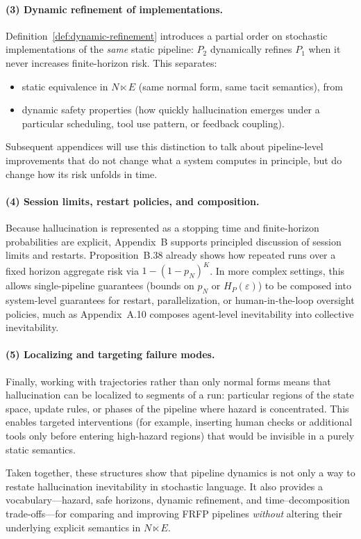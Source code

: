 \paragraph{(3) Dynamic refinement of implementations.}
Definition~\ref{def:dynamic-refinement} introduces a partial order on
stochastic implementations of the \emph{same} static pipeline: $P_2$
dynamically refines $P_1$ when it never increases finite-horizon risk.
This separates:
\begin{itemize}
  \item static equivalence in $N \ltimes E$ (same normal form, same tacit
        semantics), from
  \item dynamic safety properties (how quickly hallucination emerges under a
        particular scheduling, tool use pattern, or feedback coupling).
\end{itemize}
Subsequent appendices will use this distinction to talk about pipeline-level
improvements that do not change what a system computes in principle, but do
change how its risk unfolds in time.

\paragraph{(4) Session limits, restart policies, and composition.}
Because hallucination is represented as a stopping time and finite-horizon
probabilities are explicit, Appendix~B supports principled discussion of
session limits and restarts. Proposition~B.38 already shows how repeated
runs over a fixed horizon aggregate risk via $1 - (1 - p_N)^K$. In more
complex settings, this allows single-pipeline guarantees (bounds on $p_N$
or $H_P(\varepsilon)$) to be composed into system-level guarantees for
restart, parallelization, or human-in-the-loop oversight policies, much as
Appendix~A.10 composes agent-level inevitability into collective inevitability.

\paragraph{(5) Localizing and targeting failure modes.}
Finally, working with trajectories rather than only normal forms means that
hallucination can be localized to segments of a run: particular regions of
the state space, update rules, or phases of the pipeline where hazard is
concentrated. This enables targeted interventions (for example, inserting
human checks or additional tools only before entering high-hazard regions)
that would be invisible in a purely static semantics.

Taken together, these structures show that pipeline dynamics is not only a
way to restate hallucination inevitability in stochastic language. It also
provides a vocabulary---hazard, safe horizons, dynamic refinement, and
time--decomposition trade-offs---for comparing and improving FRFP pipelines
\emph{without} altering their underlying explicit semantics in $N \ltimes E$.
